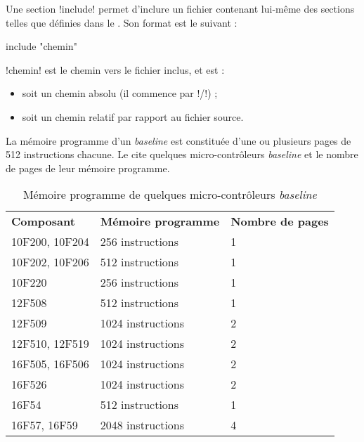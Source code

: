 
Une section \pic!include! permet d'inclure un fichier contenant lui-même des sections telles que définies dans le .  Son format est le suivant :

\begin{piccolo}
  include "chemin"
\end{piccolo}

\pic!chemin! est le chemin vers le fichier inclus, et est :
\begin{itemize}
  \item soit un chemin absolu (il commence par \pic!/!) ;
  \item soit un chemin relatif par rapport au fichier source.
\end{itemize}


La mémoire programme d'un \emph{baseline} est constituée d'une ou plusieurs pages de 512 instructions chacune. Le  cite quelques micro-contrôleurs \emph{baseline} et le nombre de pages de leur mémoire programme.

\begin{table}[!t]
  \centering
  \small
  \begin{tabular}{lll}
    \textbf{Composant} & \textbf{Mémoire programme} & \textbf{Nombre de pages}\\
    10F200, 10F204  & 256 instructions & 1\\
    \hdashline
    10F202, 10F206  & 512 instructions & 1\\
    \hdashline
    10F220  & 256 instructions & 1\\
    \hdashline
    12F508  & 512 instructions & 1\\
    \hdashline
    12F509  & 1024 instructions & 2\\
    \hdashline
    12F510, 12F519  & 1024 instructions & 2\\
    \hdashline
    16F505, 16F506  & 1024 instructions & 2\\
    \hdashline
    16F526 & 1024 instructions & 2\\
    \hdashline
    16F54  & 512 instructions & 1\\
    \hdashline
    16F57, 16F59  & 2048 instructions & 4\\
  \end{tabular}
  \caption{Mémoire programme de quelques micro-contrôleurs \emph{baseline}}
  \ligne
\end{table}

